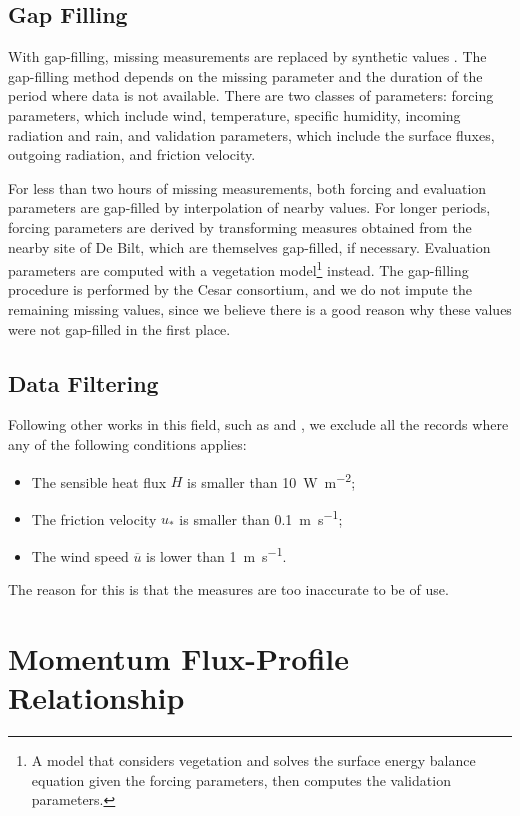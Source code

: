\documentclass[a4paper,11pt]{kth-mag}
\begin{document}
\subsection{Gap Filling}
\label{sec:gap_filling}
With gap-filling, missing measurements are replaced by synthetic values \citep{cabauw_gapfilling}. The gap-filling method depends on the missing parameter and the duration of the period where data is not available. There are two classes of parameters: forcing parameters, which include wind, temperature, specific humidity, incoming radiation and rain, and validation parameters, which include the surface fluxes, outgoing radiation, and friction velocity.

For less than two hours of missing measurements, both forcing and evaluation parameters are gap-filled by interpolation of nearby values. For longer periods, forcing parameters are derived by transforming measures obtained from the nearby site of De Bilt, which are themselves gap-filled, if necessary. Evaluation parameters are computed with a vegetation model\footnote{A model that considers vegetation and solves the surface energy balance equation given the forcing parameters, then computes the validation parameters.} instead. The gap-filling procedure is performed by the Cesar consortium, and we do not impute the remaining missing values, since we believe there is a good reason why these values were not gap-filled in the first place.

\subsection{Data Filtering}
\label{sec:data_filter}
Following other works in this field, such as \cite{boulder} and \cite{hogstrom88}, we exclude all the records where any of the following conditions applies:

\begin{itemize}
\item The sensible heat flux $H$ is smaller than \SI{10}{\watt\per\square\meter};
\item The friction velocity $u_*$ is smaller than \SI{0.1}{\meter\per\second};
\item The wind speed $\overline{u}$ is lower than \SI{1}{\meter\per\second}.
\end{itemize}

The reason for this is that the measures are too inaccurate to be of use.


\section{Momentum Flux-Profile Relationship}
\label{sec:profiles}
\end{document}
